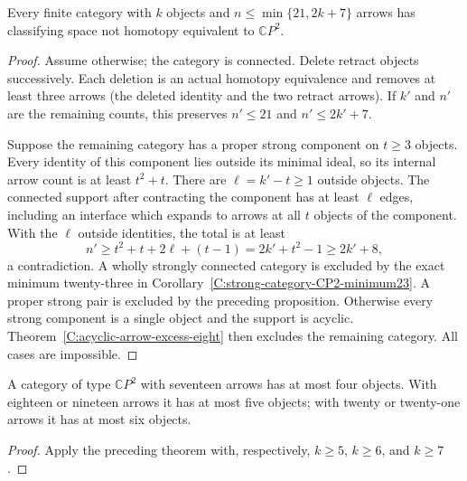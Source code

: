 \begin{theorem}\label{C:all-category-excess-eight-through21}
Every finite category with $k$ objects and
$n\leq\min\{21,2k+7\}$ arrows has classifying space not
homotopy equivalent to $\mathbb CP^2$.
\end{theorem}
\begin{proof}
Assume otherwise; the category is connected. Delete retract
objects successively. Each deletion is an actual homotopy
equivalence and removes at least three arrows (the deleted
identity and the two retract arrows). If $k'$ and $n'$ are
the remaining counts, this preserves
$n'\leq21$ and $n'\leq2k'+7$.

Suppose the remaining category has a proper strong component
on $t\geq3$ objects. Every identity of this component lies
outside its minimal ideal, so its internal arrow count is
at least $t^2+t$. There are $\ell=k'-t\geq1$ outside objects.
The connected support after contracting the component has
at least $\ell$ edges, including an interface which expands
to arrows at all $t$ objects of the component. With the
$\ell$ outside identities, the total is at least
\[
 n'\geq t^2+t+2\ell+(t-1)
       =2k'+t^2-1\geq2k'+8,
\]
a contradiction. A wholly strongly connected category is
excluded by the exact minimum twenty-three in
Corollary~\ref{C:strong-category-CP2-minimum23}.
A proper strong pair is excluded by the preceding proposition.
Otherwise every strong component is a single object and the
support is acyclic. Theorem~\ref{C:acyclic-arrow-excess-eight}
then excludes the remaining category. All cases are impossible.
\end{proof}

\begin{corollary}\label{C:CP2-object-bounds-through21}
A category of type $\mathbb CP^2$ with seventeen arrows has
at most four objects. With eighteen or nineteen arrows it
has at most five objects; with twenty or twenty-one arrows
it has at most six objects.
\end{corollary}
\begin{proof}
Apply the preceding theorem with, respectively,
$k\geq5$, $k\geq6$, and $k\geq7$.
\end{proof}
